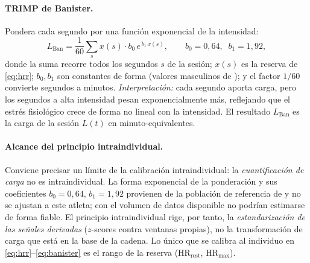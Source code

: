 \documentclass[11pt,a4paper]{article}
\begin{document}
\paragraph{TRIMP de Banister.} Pondera cada segundo por una función exponencial de la intensidad:
\begin{equation}
L_{\mathrm{Ban}} = \frac{1}{60}\sum_{s} x(s)\cdot b_0\, e^{\,b_1\, x(s)},
\qquad b_0 = 0{,}64,\;\; b_1 = 1{,}92,
\label{eq:banister}
\end{equation}
donde la suma recorre todos los segundos $s$ de la sesión; $x(s)$ es la reserva de \eqref{eq:hrr}; $b_0,b_1$ son constantes de forma (valores masculinos de \citealp{banister1991}); y el factor $1/60$ convierte segundos a minutos. \textit{Interpretación:} cada segundo aporta carga, pero los segundos a alta intensidad pesan exponencialmente más, reflejando que el estrés fisiológico crece de forma no lineal con la intensidad. El resultado $L_{\mathrm{Ban}}$ es la carga de la sesión $L(t)$ en minuto-equivalentes.

\paragraph{Alcance del principio intraindividual.} Conviene precisar un límite de la calibración intraindividual: la \emph{cuantificación de carga} no es intraindividual. La forma exponencial de la ponderación y sus coeficientes $b_0=0{,}64$, $b_1=1{,}92$ provienen de la población de referencia de \citet{banister1991} y no se ajustan a este atleta; con el volumen de datos disponible no podrían estimarse de forma fiable. El principio intraindividual rige, por tanto, la \emph{estandarización de las señales derivadas} ($z$-scores contra ventanas propias), no la transformación de carga que está en la base de la cadena. Lo único que se calibra al individuo en \eqref{eq:hrr}--\eqref{eq:banister} es el rango de la reserva ($\mathrm{HR}_{\mathrm{rest}}$, $\mathrm{HR}_{\max}$).
\end{document}
